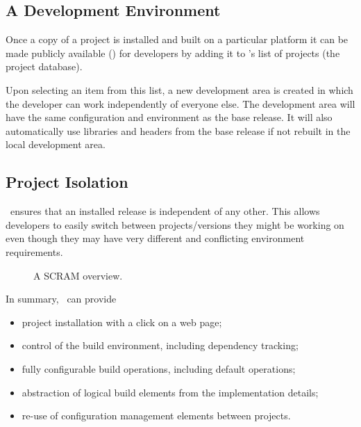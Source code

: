 \subsection{A Development Environment}\label{sec:de}
Once a copy of a project is installed and built on a particular
platform it can be made publicly available () for developers
by adding it to \scram's list of projects (the project database).

\ni Upon selecting an item from this list, a new development area is
created in which the developer can work independently of everyone
else. The development area will have the same configuration and
environment as the base release. It will also automatically use
libraries and headers from the base release if not rebuilt in the
local development area.

\subsection{Project Isolation}
\scram\ ensures that an installed release is independent of any other.
This allows developers to easily switch between projects/versions they
might be working on even though they may have very different and
conflicting environment requirements.
\begin{latexonly}
  \begin{figure}[ht]
    \begin{center}        
      \leavevmode {}
      \caption[A SCRAM overview.] 
      {A SCRAM overview.}
      \label{f:SCRAM}
    \end{center}
  \end{figure}
\end{latexonly}

\ni In summary, \scram\ can provide
\begin{itemize}
\item project installation with a click on a web page;
\item control of the build environment, including dependency tracking;
\item fully configurable build operations, including default operations;
\item abstraction of logical build elements from the implementation details;
\item re-use of configuration management elements between projects.
\end{itemize}



